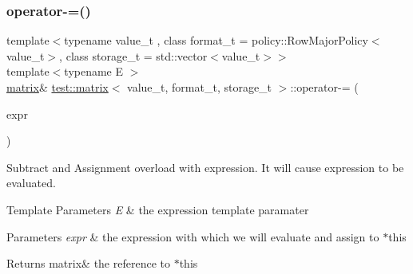 \subsubsection{\texorpdfstring{operator-\/=()}{operator-=()}}
{\footnotesize\ttfamily template$<$typename value\+\_\+t , class format\+\_\+t  = policy\+::\+Row\+Major\+Policy$<$value\+\_\+t$>$, class storage\+\_\+t  = std\+::vector$<$value\+\_\+t$>$$>$ \\
template$<$typename E $>$ \\
\mbox{\hyperlink{classtest_1_1matrix}{matrix}}\& \mbox{\hyperlink{classtest_1_1matrix}{test\+::matrix}}$<$ value\+\_\+t, format\+\_\+t, storage\+\_\+t $>$\+::operator-\/= (\begin{DoxyParamCaption}\item[{\mbox{\hyperlink{classtest_1_1expression}{expression}}$<$ E $>$ const \&}]{expr }\end{DoxyParamCaption})\hspace{0.3cm}{\ttfamily [inline]}}



Subtract and Assignment overload with expression. It will cause expression to be evaluated. 


\begin{DoxyTemplParams}{Template Parameters}
{\em E} & the expression template paramater \\
\hline
\end{DoxyTemplParams}

\begin{DoxyParams}{Parameters}
{\em expr} & the expression with which we will evaluate and assign to $\ast$this \\
\hline
\end{DoxyParams}
\begin{DoxyReturn}{Returns}
matrix\& the reference to $\ast$this 
\end{DoxyReturn}
\mbox{\label{classtest_1_1matrix_af775ea504d511a5bd706c510b428a832}} 
